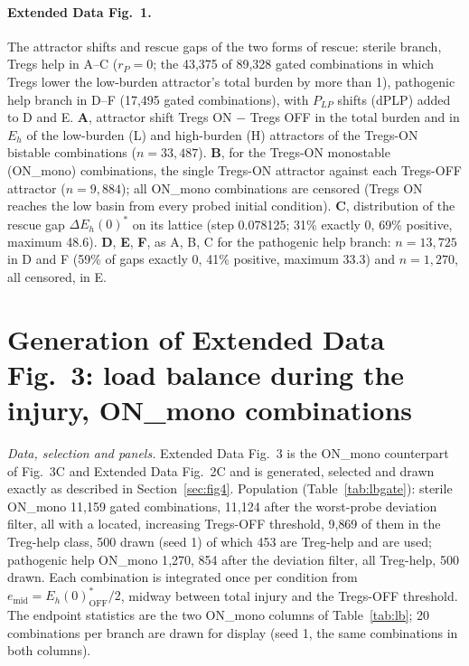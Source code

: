 \documentclass[11pt]{article}
\begin{document}
\paragraph{Extended Data Fig.~1.}
The attractor shifts and rescue gaps of the two forms of rescue: sterile branch, Tregs
help in A--C ($r_P = 0$; the 43,375 of 89,328 gated combinations in which Tregs lower the
low-burden attractor's total burden by more than 1), pathogenic help branch in D--F (17,495 gated
combinations), with $P_{LP}$ shifts (dPLP) added to D and E.
\textbf{A}, attractor shift Tregs ON $-$ Tregs OFF in the total burden and in $E_h$ of the
low-burden (L) and high-burden (H) attractors of the Tregs-ON bistable combinations
($n = 33{,}487$). \textbf{B}, for the Tregs-ON monostable (ON\_mono) combinations, the
single Tregs-ON attractor against each Tregs-OFF attractor ($n = 9{,}884$); all ON\_mono
combinations are censored (Tregs ON reaches the low basin from every probed initial
condition). \textbf{C}, distribution of
the rescue gap $\Delta E_h(0)^*$ on its lattice (step 0.078125; 31\% exactly 0, 69\%
positive, maximum 48.6). \textbf{D}, \textbf{E}, \textbf{F}, as A, B, C for the
pathogenic help branch: $n = 13{,}725$ in D and F (59\% of gaps exactly 0, 41\% positive,
maximum 33.3) and $n = 1{,}270$, all censored, in E.

\section{Generation of Extended Data Fig.~3: load balance during the injury, ON\_mono combinations}
\label{sec:figS02}

\emph{Data, selection and panels.} Extended Data Fig.~3 is the ON\_mono
counterpart of Fig.~3C and Extended Data Fig.~2C and is generated, selected and drawn exactly as described in
Section~\ref{sec:fig4}. Population (Table~\ref{tab:lbgate}): sterile ON\_mono 11{,}159
gated combinations, 11{,}124 after the worst-probe deviation filter, all with a located,
increasing Tregs-OFF threshold, 9{,}869 of them in the Treg-help class, 500 drawn (seed 1) of
which 453 are Treg-help and are used; pathogenic help ON\_mono 1{,}270, 854 after the deviation
filter, all Treg-help, 500 drawn. Each combination is integrated once per
condition from $e_{\mathrm{mid}} = E_h(0)^*_{\mathrm{OFF}}/2$, midway between total
injury and the Tregs-OFF threshold. The endpoint statistics are the two ON\_mono
columns of Table~\ref{tab:lb}; 20 combinations per branch are drawn for display (seed
1, the same combinations in both columns).
\end{document}
